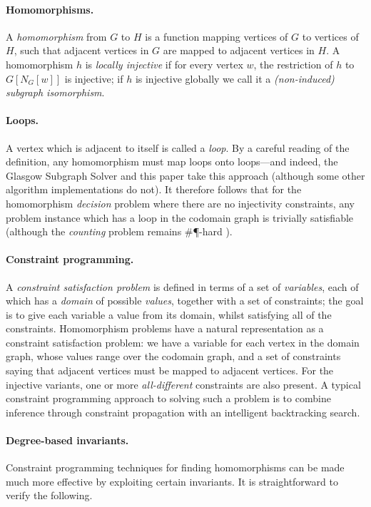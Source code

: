 \documentclass{article}
\begin{document}
\paragraph{Homomorphisms.} A \emph{homomorphism} from $G$ to $H$ is a function mapping vertices of
$G$ to vertices of $H$, such that adjacent vertices in $G$ are mapped to adjacent vertices in $H$. A
homomorphism $h$ is \emph{locally injective} if for every vertex $w$, the restriction of $h$ to
$G[N_G[w]]$ is injective; if $h$ is injective globally we call it a \emph{(non-induced) subgraph
isomorphism}.

\paragraph{Loops.} A vertex which is adjacent to itself is called a \emph{loop}. By a careful reading
of the definition, any homomorphism must map loops onto loops---and indeed, the Glasgow Subgraph
Solver and this paper take this approach (although some other algorithm implementations do not). It
therefore follows that for the homomorphism \emph{decision} problem where there are no injectivity
constraints, any problem instance which has a loop in the codomain graph is trivially satisfiable
(although the \emph{counting} problem remains \#\P-hard \cite{DBLP:journals/rsa/DyerG00}).

\paragraph{Constraint programming.} A \emph{constraint satisfaction problem} is defined in terms of
a set of \emph{variables}, each of which has a \emph{domain} of possible \emph{values}, together
with a set of constraints; the goal is to give each variable a value from its domain, whilst
satisfying all of the constraints. Homomorphism problems have a natural representation as a
constraint satisfaction problem: we have a variable for each vertex in the domain graph, whose
values range over the codomain graph, and a set of constraints saying that adjacent vertices must be
mapped to adjacent vertices. For the injective variants, one or more \emph{all-different}
constraints are also present. A typical constraint programming approach to solving such a problem is
to combine inference through constraint propagation with an intelligent backtracking search.

\paragraph{Degree-based invariants.} Constraint programming techniques for finding
homomorphisms can be made much more effective by exploiting certain invariants. It is
straightforward to verify the following.
\end{document}
